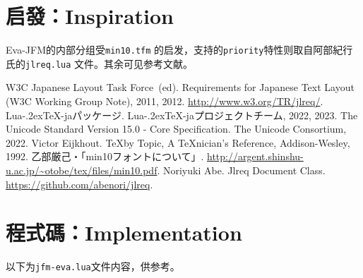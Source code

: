 \documentclass{ltjsarticle}
\def\LuaTeX{Lua\kern-.2ex\TeX}
\begin{document}
\section{启發：Inspiration}
\textsf{Eva-JFM}的内部分组受\texttt{min10.tfm} \cite{min10}的启发，支持的\texttt{priority}特性则取自阿部紀行氏的\texttt{jlreq.lua} \cite{ltxjlreq}文件。其余可见参考文献。

\begin{thebibliography}{99}
     W3C Japanese Layout Task Force~(ed). \newblock Requirements for Japanese Text Layout (W3C Working Group Note), 2011, 2012. \newblock \url{http://www.w3.org/TR/jlreq/}.
     \LuaTeX-jaパッケージ. \newblock \LuaTeX-jaプロジェクトチーム, 2022, 2023.
     The Unicode Standard Version 15.0 - Core Specification. \newblock The Unicode Consortium, 2022.
     Victor Eijkhout. \newblock \TeX by Topic, A \TeX nician's Reference, Addison-Wesley, 1992.
     乙部厳己・「min10フォントについて」. \newblock \url{http://argent.shinshu-u.ac.jp/~otobe/tex/files/min10.pdf}.
     Noriyuki Abe. \newblock Jlreq Document Class. \newblock \url{https://github.com/abenori/jlreq}.
\end{thebibliography}

\section*{程式碼：Implementation}\label{sec:impl}
以下为\texttt{jfm-eva.lua}文件内容，供参考。%

\end{document}

